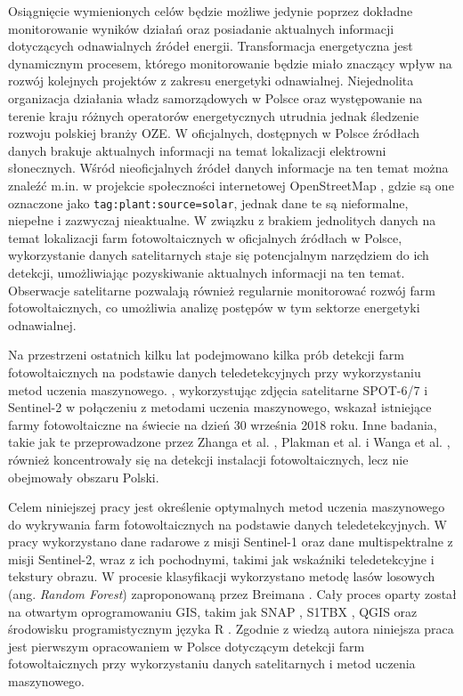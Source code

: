 \documentclass{amuthesis}
\begin{document}
Osiągnięcie wymienionych celów będzie możliwe jedynie poprzez dokładne
monitorowanie wyników działań oraz posiadanie aktualnych informacji
dotyczących odnawialnych źródeł energii. Transformacja energetyczna jest
dynamicznym procesem, którego monitorowanie będzie miało znaczący wpływ
na rozwój kolejnych projektów z zakresu energetyki odnawialnej.
Niejednolita organizacja działania władz samorządowych w Polsce oraz
występowanie na terenie kraju różnych operatorów energetycznych utrudnia
jednak śledzenie rozwoju polskiej branży OZE. W oficjalnych, dostępnych
w Polsce źródłach danych brakuje aktualnych informacji na temat
lokalizacji elektrowni słonecznych. Wśród nieoficjalnych źródeł danych
informacje na ten temat można znaleźć m.in. w projekcie społeczności
internetowej OpenStreetMap \autocite{OpenStreetMap}, gdzie są one
oznaczone jako \texttt{tag:plant:source=solar}, jednak dane te są
nieformalne, niepełne i zazwyczaj nieaktualne. W związku z brakiem
jednolitych danych na temat lokalizacji farm fotowoltaicznych w
oficjalnych źródłach w Polsce, wykorzystanie danych satelitarnych staje
się potencjalnym narzędziem do ich detekcji, umożliwiając pozyskiwanie
aktualnych informacji na ten temat. Obserwacje satelitarne pozwalają
również regularnie monitorować rozwój farm fotowoltaicznych, co
umożliwia analizę postępów w tym sektorze energetyki odnawialnej.

Na przestrzeni ostatnich kilku lat podejmowano kilka prób detekcji farm
fotowoltaicznych na podstawie danych teledetekcyjnych przy wykorzystaniu
metod uczenia maszynowego. \textcite{kruitwagen_2021_pv}, wykorzystując
zdjęcia satelitarne SPOT-6/7 i Sentinel-2 w połączeniu z metodami
uczenia maszynowego, wskazał istniejące farmy fotowoltaiczne na świecie
na dzień 30 września 2018 roku. Inne badania, takie jak te
przeprowadzone przez Zhanga et al. \autocite*{zhang_2021_texture},
Plakman et al. \autocite*{plakman_2022_pv} i Wanga et al.
\autocite*{wang_2022_pv}, również koncentrowały się na detekcji
instalacji fotowoltaicznych, lecz nie obejmowały obszaru Polski.

Celem niniejszej pracy jest określenie optymalnych metod uczenia
maszynowego do wykrywania farm fotowoltaicznych na podstawie danych
teledetekcyjnych. W pracy wykorzystano dane radarowe z misji Sentinel-1
oraz dane multispektralne z misji Sentinel-2, wraz z ich pochodnymi,
takimi jak wskaźniki teledetekcyjne i tekstury obrazu. W procesie
klasyfikacji wykorzystano metodę lasów losowych (ang. \emph{Random
Forest}) zaproponowaną przez Breimana \autocite*{breiman_2001_rf}. Cały
proces oparty został na otwartym oprogramowaniu GIS, takim jak SNAP
\autocite{snap}, S1TBX \autocite{s1tbx}, QGIS \autocite{qgis} oraz
środowisku programistycznym języka R \autocite{R-base}. Zgodnie z wiedzą
autora niniejsza praca jest pierwszym opracowaniem w Polsce dotyczącym
detekcji farm fotowoltaicznych przy wykorzystaniu danych satelitarnych i
metod uczenia maszynowego.
\end{document}
